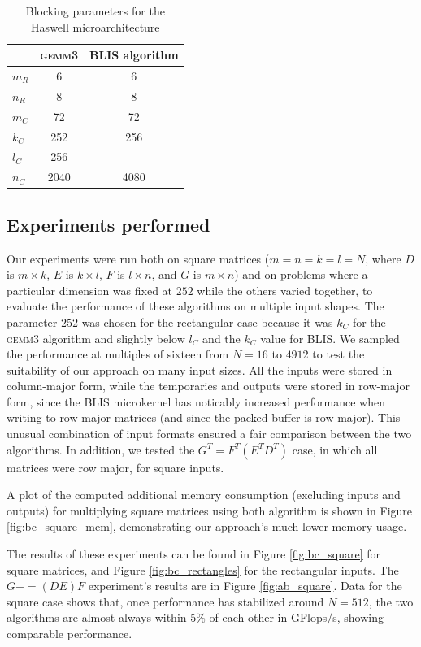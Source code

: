 \documentclass[12pt]{article}
\newcommand*{\pluseq}{\mathrel{{+}{=}}}
\newcommand*{\gemmt}{{\textsc{gemm3}}}
\begin{document}
\begin{table}
  \centering
  \begin{tabular}{l|c c}
    &\gemmt{}&BLIS algorithm\\ \hline
    $m_R$&6&6\\
    $n_R$&8&8\\
    $m_C$&72&72\\
    $k_C$&252&256\\
    $l_C$&256&\\
    $n_C$&2040&4080\\
  \end{tabular}
  \caption{Blocking parameters for the Haswell microarchitecture}
  \label{tab:parameters}
\end{table}

\subsection{Experiments performed}
Our experiments were run both on square matrices ($m = n = k = l = N$, where $D$ is $m \times k$, $E$ is $k \times l$, $F$ is $l \times n$, and $G$ is $m \times n$) and on problems where a particular dimension was fixed at $252$ while the others varied together, to evaluate the performance of these algorithms on multiple input shapes.
The parameter $252$ was chosen for the rectangular case because it was $k_C$ for the \gemmt{} algorithm and slightly below $l_C$ and the $k_C$ value for BLIS.
We sampled the performance at multiples of sixteen from $N = 16$ to $4912$ to test the suitability of our approach on many input sizes.
All the inputs were stored in column-major form, while the temporaries and outputs were stored in row-major form, since the BLIS microkernel has noticably increased performance when writing to row-major matrices (and since the packed buffer is row-major).
This unusual combination of input formats ensured a fair comparison between the two algorithms.
In addition, we tested the $G^T = F^T(E^TD^T)$ case, in which all matrices were row major, for square inputs.

A plot of the computed additional memory consumption (excluding inputs and outputs) for multiplying square matrices using both algorithm is shown in Figure \ref{fig:bc_square_mem}, demonstrating our approach's much lower memory usage.

The results of these experiments can be found in Figure \ref{fig:bc_square} for square matrices, and Figure \ref{fig:bc_rectangles} for the rectangular inputs.
The $G \pluseq (DE)F$ experiment's results are in Figure \ref{fig:ab_square}.
Data for the square case shows that, once performance has stabilized around $N = 512$, the two algorithms are almost always within 5\% of each other in GFlops/s, showing comparable performance.
\end{document}
